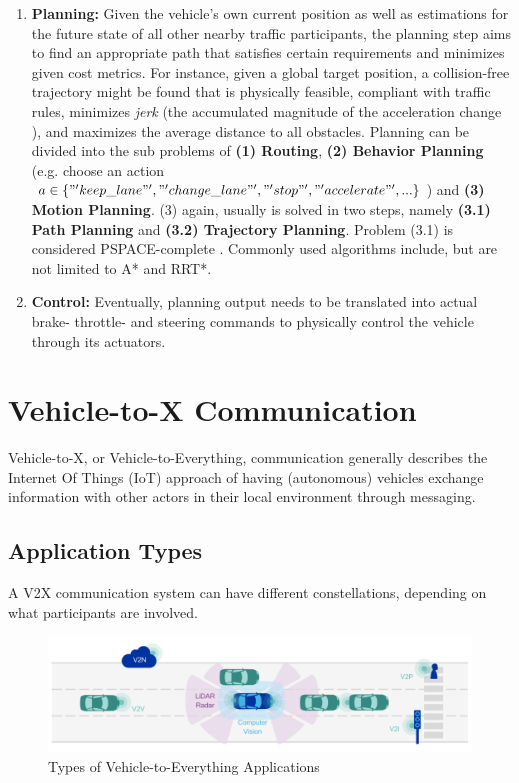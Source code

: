 \begin{enumerate}
	\item \textbf{Planning:} Given the vehicle's own current position as well as estimations for the future state of all other nearby traffic participants, the planning step aims to find an appropriate path that satisfies certain requirements and minimizes given cost metrics. For instance, given a global target position, a collision-free trajectory might be found that is physically feasible, compliant with traffic rules, minimizes \textit{jerk} (the accumulated magnitude of the acceleration change \cite{paden2016survey}), and maximizes the average distance to all obstacles. Planning can be divided into the sub problems of \textbf{(1) Routing}, \textbf{(2) Behavior Planning} (e.g. choose an action $a \in \{ "'keep\_lane"', "'change\_lane"', "'stop"', "'accelerate"', ... \}$) and \textbf{(3) Motion Planning}. (3) again, usually is solved in two steps, namely \textbf{(3.1) Path Planning} and \textbf{(3.2) Trajectory Planning}. Problem (3.1) is considered PSPACE-complete \cite{paden2016survey}. Commonly used algorithms include, but are not limited to A* and RRT*.
	\item \textbf{Control:} Eventually, planning output needs to be translated into actual brake- throttle- and steering commands to physically control the vehicle through its actuators. 
\end{enumerate}

\section{Vehicle-to-X Communication}
\label{sec:background:v2x_communication}
Vehicle-to-X, or Vehicle-to-Everything, communication generally describes the Internet Of Things (IoT) approach of having (autonomous) vehicles exchange information with other actors in their local environment through messaging.

\subsection{Application Types}
\label{subsec:background:application_types}
A V2X communication system can have different constellations, depending on what participants are involved.

\begin{figure}[H]
	\centering
	\includegraphics[width=1.0\textwidth]{98_images/v2x_types.png}
	\caption[Types of Vehicle-to-Everything Applications]{Types of Vehicle-to-Everything Applications \cite{5GAutomotiveAssociation2016}}
	\label{fig:v2x_types}
\end{figure}

